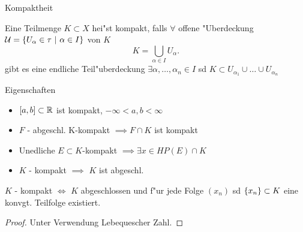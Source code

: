 \documentclass[class=article, crop=false]{standalone}
\begin{document}
\begin{zettel}{Kompaktheit}
\begin{definition}
    Eine Teilmenge $K \subset  X$ hei"st kompakt, falls $\forall $ offene "Uberdeckung $\mathcal{U} =\set{U_{\alpha}\in  \tau}{\alpha \in I}$ von $K$ 
\[
    K = \bigcup_{\alpha \in  I} U_\alpha
.\]
gibt es eine endliche Teil"uberdeckung $\exists \alpha, \dots, \alpha_n \in  I$ sd $K \subset  U_{\alpha_{1}} \cup \dots \cup U_{\alpha_n}$ 
\end{definition}

\begin{remark}
    Eigenschaften
\begin{itemize}
    \item $[a,b] \subset \mathbb{R}$ ist kompakt,  $-\infty < a,b < \infty $
    \item $F$ - abgeschl. K-kompakt $\implies F \cap K$ ist kompakt
    \item Unedliche $E \subset K $-kompakt  $\implies \exists x \in  HP (E) \cap K$ 
    \item $K$ - kompakt $\implies $ $K$ ist abgeschl.
\end{itemize}
\end{remark}

\begin{theorem}
$K$ - kompakt $\iff  $  $K$ abgeschlossen und f"ur jede Folge $(x_n )$ sd $\set{x_n } \subset K$ eine konvgt. Teilfolge existiert.
\begin{proof}
    Unter Verwendung Lebequescher Zahl.
\end{proof}
\end{theorem}

\end{zettel}
\end{document}
